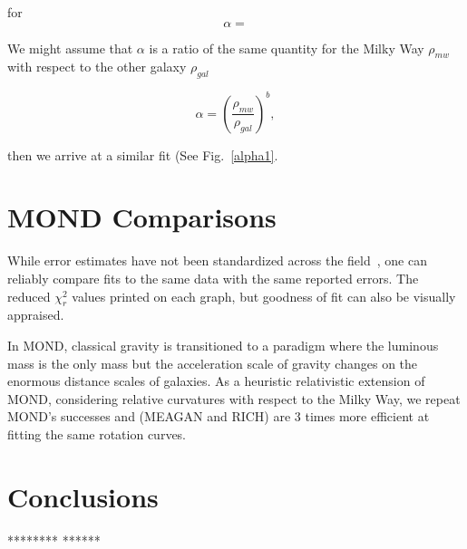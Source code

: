 \documentclass[reprint,%
 amsmath,amssymb,
 aps,
]{revtex4-1}
\begin{document}
for 
\begin{equation}
    \alpha = 
\end{equation}



We might assume that $\alpha$ is a ratio of the same quantity for  the Milky Way $\rho_{mw}$ with respect to the other   galaxy $\rho_{gal}$  

\begin{equation}
\alpha=\left(\frac{\rho_{mw}}{\rho_{gal}}\right)^{b}  ,
\label{correl}
\end{equation}

then we arrive at a similar fit (See Fig.~\ref{alpha1}.



 

  
 
\section{MOND Comparisons}


While error    estimates have not been standardized across the field~\citep{Blok,Gent,Toky},     one can reliably   compare fits to the same data with the same reported errors. The     reduced $\chi^2_r$ values printed on each graph, but goodness of fit can also be visually appraised.  
 
 In MOND,  classical gravity is transitioned to  a paradigm where the luminous mass is the only mass  but    the acceleration scale of gravity changes on the enormous distance scales of galaxies.  As a heuristic  relativistic extension of MOND,  
  considering relative curvatures with respect to the Milky Way, we repeat MOND's successes and (MEAGAN and RICH) are 3 times more efficient at fitting the same rotation curves. 
 
 
 
  

 
  
 \section{  Conclusions   }
********
******
 
\end{document}
